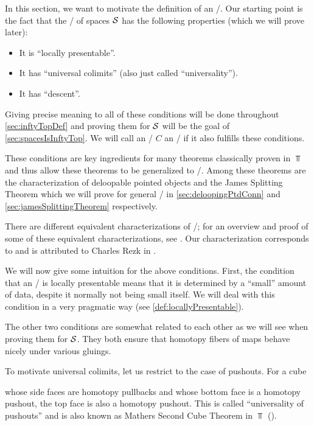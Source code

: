 In this section, we want to motivate the definition of an \inftytop/.
Our starting point is the fact that the \inftycat/ of spaces $\mathcal{S}$ has the following properties (which we will prove later):
\begin{itemize} 
    \item It is ``locally presentable''.
    \item It has ``universal colimits'' (also just called ``universality'').
    \item It has ``descent''.
\end{itemize}
Giving precise meaning to all of these conditions will be done throughout \cref{sec:inftyTopDef} and proving them for $\mathcal{S}$ will be the goal of \cref{sec:spacesIsInftyTop}.
We will call an \inftycat/ $C$ an \inftytop/ if it also fulfills these conditions.

These conditions are key ingredients for many theorems classically proven in $\Top$ and thus allow these theorems to be generalized to \inftytops/.
Among these theorems are the characterization of deloopable pointed objects and the James Splitting Theorem which we will prove for general \inftytops/ in \cref{sec:deloopingPtdConn} and \cref{sec:jamesSplittingTheorem} respectively.

There are different equivalent characterizations of \inftytops/; 
for an overview and proof of some of these equivalent characterizations, see \cite[\S 6.1]{HTT}.
Our characterization corresponds to \cite[Theorem 6.1.0.6 (2)]{HTT} and is attributed to Charles Rezk in \cite[\S 6.1.3]{HTT}.

We will now give some intuition for the above conditions.
First, the condition that an \inftycat/ is locally presentable means that it is determined by a ``small'' amount of data, despite it normally not being small itself.
We will deal with this condition in a very pragmatic way (see \cref{def:locallyPresentable}).

The other two conditions are somewhat related to each other as we will see when proving them for $\mathcal{S}$.
They both ensure that homotopy fibers of maps behave nicely under various gluings.

To motivate universal colimits, let us restrict to the case of pushouts.
For a cube 
\begin{center}
\end{center}
whose side faces are homotopy pullbacks and whose bottom face is a homotopy pushout, the top face is also a homotopy pushout.
This is called ``universality of pushouts'' and is also known as Mathers Second Cube Theorem in $\Top$ (\cite[Theorem 25]{mather_1976}).

